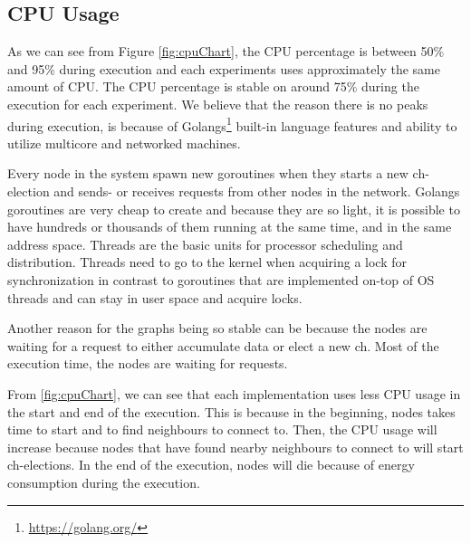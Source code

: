 \documentclass[USenglish]{uit-thesis}
\begin{document}
\subsection{CPU Usage}
As we can see from Figure \ref{fig:cpuChart}, the CPU percentage is between 50\% and 95\% during execution and each experiments uses approximately the same amount of CPU.
The CPU percentage is stable on around 75\% during the execution for each experiment. We believe that the reason there is no peaks during execution, is because of Golangs\footnote{\url{https://golang.org/}} built-in language features and ability to utilize multicore and networked machines.

Every node in the system spawn new goroutines when they starts a new \gls{ch}-election and sends- or receives requests from other nodes in the network.
Golangs goroutines are very cheap to create and because they are so light, it is possible to have hundreds or thousands of them running at the same time, and in the same address space. Threads are the basic units for processor scheduling and distribution. Threads need to go to the kernel when acquiring a lock for synchronization in contrast to goroutines that are implemented on-top of OS threads and can stay in user space and acquire locks.

Another reason for the graphs being so stable can be because the nodes are waiting for a request to either accumulate data or elect a new \gls{ch}. Most of the execution time, the nodes are waiting for requests.

From \autoref{fig:cpuChart}, we can see that each implementation uses less CPU usage in the start and end of the execution. This is because in the beginning, nodes takes time to start and to find neighbours to connect to. Then, the CPU usage will increase because nodes that have found nearby neighbours to connect to will start \gls{ch}-elections.
In the end of the execution, nodes will die because of energy consumption during the execution.



\end{document}
